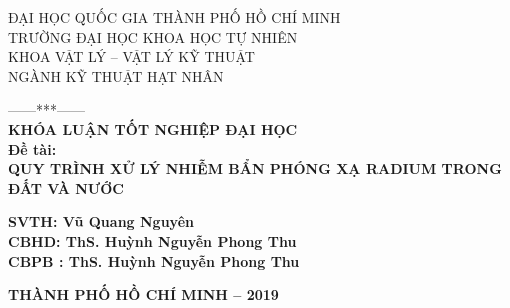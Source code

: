 
\begin{titlepage}
    \thisfancypage{%
    \setlength{\fboxsep}{10pt}\doublebox}{}
    
    


\newcommand\nbvspace[1][3]{\vspace*{\stretch{#1}}}
\newcommand\nbstretchyspace{\spaceskip0.5em plus 0.25em minus 0.25em}
\newcommand{\nbtitlestretch}{}
\pagestyle{empty}


\begin{center}
{\nbtitlestretch\normalsize
ĐẠI HỌC QUỐC GIA THÀNH PHỐ HỒ CHÍ MINH\\
TRƯỜNG ĐẠI HỌC KHOA HỌC TỰ NHIÊN\\
KHOA VẬT LÝ – VẬT LÝ KỸ THUẬT\\
NGÀNH KỸ THUẬT HẠT NHÂN}

\nbvspace[1]
------***------\\[1cm]
\bfseries
\normalsize
\nbvspace[1]
\large KHÓA LUẬN TỐT NGHIỆP ĐẠI HỌC\\[4cm]
\normalsize Đề tài:\\
\large QUY TRÌNH XỬ LÝ NHIỄM BẨN PHÓNG XẠ RADIUM TRONG ĐẤT VÀ NƯỚC

\nbvspace[2]




\nbvspace[3]
  \bfseries
  \normalsize
\hspace*{5cm}  SVTH: Vũ Quang Nguyên\\
\hspace*{5cm}  CBHD: ThS. Huỳnh Nguyễn Phong Thu\\
\hspace*{5cm}  CBPB : ThS. Huỳnh Nguyễn Phong Thu
\nbvspace[2]



  \bfseries
  \nbvspace[3]
  \nbvspace[2]
  \nbvspace[4]
  \normalsize
  THÀNH PHỐ HỒ CHÍ MINH – 2019
  
\end{center}
\end{titlepage}

\blankpage


